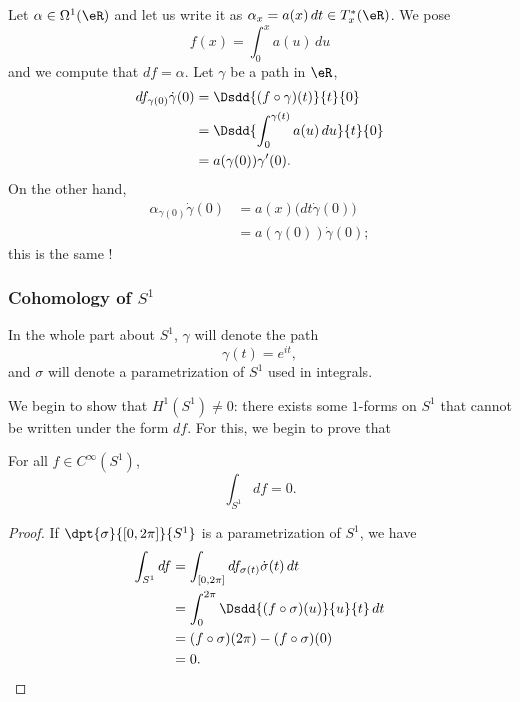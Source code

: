 Let $\alpha\in\Omega^1(\eR)$ and let us write it as $\alpha_x=a(x)\,dt\in T_x^*(\eR)$. We pose
\[ 
  f(x)=\int_0^xa(u)\,du
\]
and we compute that $df=\alpha$. Let $\gamma$ be a path in $\eR$,
\begin{equation}
\begin{split}
df_{\gamma(0)}\dot\gamma(0)&=\Dsdd{ (f\circ\gamma)(t) }{t}{0}\\
		&=\Dsdd{ \int_0^{\gamma(t)}a(u)\,du }{t}{0}\\
		&=a(\gamma(0))\gamma'(0).
\end{split}
\end{equation}
On the other hand,
\begin{equation}
\begin{split}
\alpha_{\gamma(0)}\dot\gamma(0)&=a(x)\big( dt\dot\gamma(0) \big)\\
			&=a(\gamma(0))\dot\gamma(0);
\end{split}
\end{equation}
this is the same !


\subsubsection{Cohomology of $S^1$}

In the whole part about $S^1$, $\gamma$ will denote the path
\[ 
  \gamma(t)=e^{it},
\]
and $\sigma$ will denote a parametrization of $S^1$ used in integrals.

We begin to show that $H^1(S^1)\neq0$: there exists some $1$-forms on $S^1$ that cannot be written under the form $df$. For this, we begin to prove that

\begin{proposition} \label{prop_intdfz}
For all $f\in C^{\infty}(S^1)$,
\[ 
  \int_{S^1}df=0.
\]
\end{proposition}

\begin{proof}
If $\dpt{ \sigma }{ [0,2\pi] }{ S^1 }$ is a parametrization of $S^1$, we have
\begin{equation}
\begin{split}
  \int_{S^1}df&=\int_{[0,2\pi]}df_{\sigma(t)}\dot\sigma(t)\,dt\\
		&=\int_0^{2\pi}\Dsdd{ (f\circ\sigma)(u) }{u}{t}\,dt\\
		&=(f\circ\sigma)(2\pi)-(f\circ\sigma)(0)\\
		&=0.
\end{split}
\end{equation}
\end{proof}

